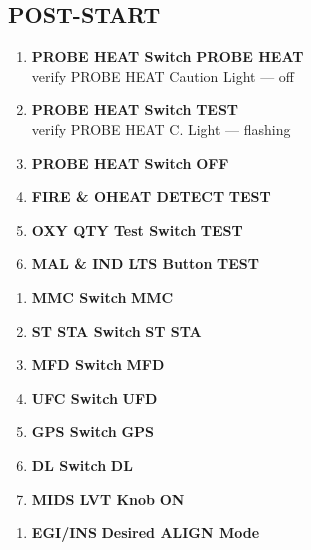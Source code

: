 \subsection{POST-START}
\begin{checklistenumerate}
    \begin{enumerate}
        \item \textbf{PROBE HEAT Switch} \dotfill \textbf{PROBE HEAT} \\
        \hfill verify PROBE HEAT Caution Light --- off
        \item \textbf{PROBE HEAT Switch} \dotfill \textbf{TEST} \\
        \hfill verify PROBE HEAT C. Light --- flashing
        \item \textbf{PROBE HEAT Switch} \dotfill \textbf{OFF}
        \item \textbf{FIRE \& OHEAT DETECT} \dotfill \textbf{TEST}
        \item \textbf{OXY QTY Test Switch} \dotfill \textbf{TEST}
        \item \textbf{MAL \& IND LTS Button} \dotfill \textbf{TEST}
    \end{enumerate}
    \cbstart
    \begin{enumerate}
        \item \textbf{MMC Switch} \dotfill \textbf{MMC}
        \item \textbf{ST STA Switch} \dotfill \textbf{ST STA}
        \item \textbf{MFD Switch} \dotfill \textbf{MFD}
        \item \textbf{UFC Switch} \dotfill \textbf{UFD}
        \item \textbf{GPS Switch} \dotfill \textbf{GPS}
        \item \textbf{DL Switch} \dotfill \textbf{DL}
        \item \textbf{MIDS LVT Knob} \dotfill \textbf{ON}
    \end{enumerate}
    \begin{enumerate}
        \item \textbf{EGI/INS} \dotfill \textbf{Desired ALIGN Mode} \\

\end{enumerate}
\end{checklistenumerate}
